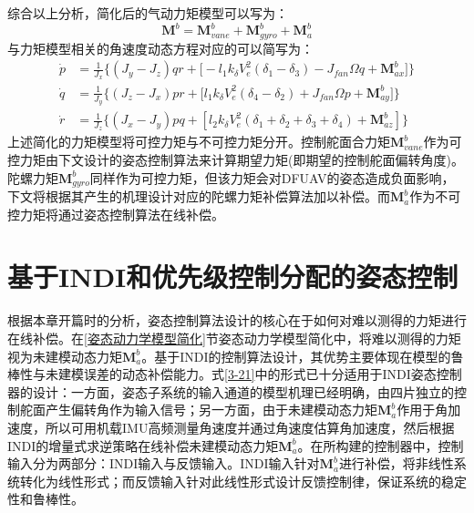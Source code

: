 综合以上分析，简化后的气动力矩模型可以写为：
\begin{equation}
    \boldsymbol{M}^b=\boldsymbol{M}_{vane}^b+\boldsymbol{M}_{gyro}^b+\boldsymbol{M}_{a}^b
    \label{3-20}
\end{equation}
与力矩模型相关的角速度动态方程对应的可以简写为：
\begin{equation}
    \begin{aligned}
        \dot{p}  &=\frac{1}{J_x}\Bigg\{ (J_y-J_z)qr+
        \big[- l_1k_\delta V_e^2(\delta_1 - \delta_3)-J_{fan}\Omega{q} +\boldsymbol{M}_{ax}^b\big]\Bigg\} \\
        \dot{q}  &=\frac{1}{J_y}\Bigg\{ (J_z-J_x)pr+
        \big[l_1k_\delta V_e^2(\delta_4 - \delta_2)+J_{fan}\Omega{p} +\boldsymbol{M}_{ay}^b\big]\Bigg\} \\
        \dot{r}  &=\frac{1}{J_z}\Bigg\{ (J_x-J_y)pq+
        \left[l_2k_\delta V_e^2(\delta_1 + \delta_2 + \delta_3 + \delta_4) + \boldsymbol{M}_{az}^b\right]
        \Bigg\}
    \end{aligned}
    \label{3-21}
\end{equation}
上述简化的力矩模型将可控力矩与不可控力矩分开。控制舵面合力矩$\boldsymbol{M}_{vane}^b$作为可控力矩由下文设计的姿态控制算法来计算期望力矩(即期望的控制舵面偏转角度)。陀螺力矩$\boldsymbol{M}_{gyro}^b$同样作为可控力矩，但该力矩会对DFUAV的姿态造成负面影响，下文将根据其产生的机理设计对应的陀螺力矩补偿算法加以补偿。而$\boldsymbol{M}_{a}^b$作为不可控力矩将通过姿态控制算法在线补偿。

\section{基于INDI和优先级控制分配的姿态控制}\label{基于INDI和优先级控制分配的姿态控制}

根据本章开篇时的分析，姿态控制算法设计的核心在于如何对难以测得的力矩进行在线补偿。在\ref{姿态动力学模型简化}节姿态动力学模型简化中，将难以测得的力矩视为未建模动态力矩$\boldsymbol{M}_{a}^b$。基于INDI的控制算法设计，其优势主要体现在模型的鲁棒性与未建模误差的动态补偿能力。式\eqref{3-21}中的形式已十分适用于INDI姿态控制器的设计：一方面，姿态子系统的输入通道的模型机理已经明确，由四片独立的控制舵面产生偏转角作为输入信号；另一方面，由于未建模动态力矩$\boldsymbol{M}_{a}^b$作用于角加速度，所以可用机载IMU高频测量角速度并通过角速度估算角加速度，然后根据INDI的增量式求逆策略在线补偿未建模动态力矩$\boldsymbol{M}_{a}^b$。在所构建的控制器中，控制输入分为两部分：INDI输入与反馈输入。INDI输入针对$\boldsymbol{M}_{a}^b$进行补偿，将非线性系统转化为线性形式；而反馈输入针对此线性形式设计反馈控制律，保证系统的稳定性和鲁棒性。

